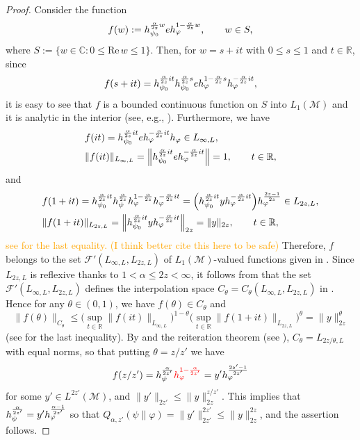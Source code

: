 \documentclass[12pt]{article}
\theoremstyle{definition}
\theoremstyle{remark}
\numberwithin{equation}{section}
\def\Me{\mathcal M}
\def\cF{\mathcal{F}}
\def\ffi{\varphi}
\def\bR{\mathbb{R}}
\def\bC{\mathbb{C}}
\def\Re{\mathrm{Re}\,}
\begin{document}
\begin{proof}
Consider the function
\begin{align}\label{F-4.18}
f(w):=h_{\psi_0}^{{\alpha\over2z}w}eh_\ffi^{1-{\alpha\over2z}w},\qquad w\in S,
\end{align}
where $S:=\{w\in\bC:0\le\Re w\le1\}$. Then, for $w=s+it$ with $0\le s\le1$ and $t\in\bR$, since
\[
f(s+it)=h_{\psi_0}^{{\alpha\over2z}it}h_{\psi_0}^{{\alpha\over2z}s}e
h_\ffi^{1-{\alpha\over2z}s}h_\ffi^{-{\alpha\over2z}it},
\]
it is easy to see that $f$ is a bounded continuous function on $S$ into $L_1(\Me)$ and it is analytic in the
interior (see, e.g., \cite[Lemma 9.19, Theorem 9.18(c)]{hiai2021lectures}). Furthermore, we have
\begin{align*}
&f(it)=h_{\psi_0}^{{\alpha\over2z}it}eh_\ffi^{-{\alpha\over2z}it}h_\ffi\in L_{\infty,L}, \\
&\|f(it)\|_{L_{\infty,L}}=\Big\|h_{\psi_0}^{{\alpha\over2z}it}eh_\ffi^{-{\alpha\over2z}it}\Big\|=1,
\qquad t\in\bR,
\end{align*}
and
\begin{align*}
&f(1+it)=h_{\psi_0}^{{\alpha\over2z}it}h_\psi^{\alpha\over2z}
h_\ffi^{1-{\alpha\over2z}}h_\ffi^{-{\alpha\over2z}it}
=\Bigl(h_{\psi_0}^{{\alpha\over2z}it}yh_\ffi^{-{\alpha\over2z}it}\Bigr)h_\ffi^{2z-1\over2z}\in L_{2z,L}, \\
&\|f(1+it)\|_{L_{2z,L}}=\Big\|h_{\psi_0}^{{\alpha\over2z}it}yh_\ffi^{-{\alpha\over2z}it}\Big\|_{2z}=\|y\|_{2z},
\qquad t\in\bR,
\end{align*}
\textcolor{orange}{ see \cite[Lemmas 10.1 and 10.2]{kosaki1984applications} for the last
equality. (I think
better cite this here to be safe)}
Therefore, $f$ belongs to the set $\cF'(L_{\infty,L},L_{2z,L})$ of $L_1(\Me)$-valued functions given in
\cite[Definition 1.4]{kosaki1984applications}. Since $L_{2z,L}$ is reflexive thanks to $1<\alpha\le2z<\infty$,
it follows from \cite[Theorems 1.5, Remark 3.4]{kosaki1984applications} that the set
$\cF'(L_{\infty,L},L_{2z,L})$ defines the interpolation space $C_\theta=C_\theta(L_{\infty,L},L_{2z,L})$ in
\cite[Definition 1.1]{kosaki1984applications}. Hence for any $\theta\in(0,1)$, we have $f(\theta)\in C_\theta$
and
\[
\|f(\theta)\|_{C_\theta}\le\biggl(\sup_{t\in\bR}\|f(it)\|_{L_{\infty,L}}\biggr)^{1-\theta}
\biggl(\sup_{t\in\bR}\|f(1+it)\|_{L_{2z,L}}\biggr)^\theta=\|y\|_{2z}^\theta
\]
{\color{red}(see \cite[Lemma 4.3.2(ii)]{bergh1976interpolation} for the last inequality).} By
\cite[Theorem 1.9]{kosaki1984applications} and the reiteration theorem {\color{red}(see
\cite{cwikel1978complex}),} $C_\theta=L_{2z/\theta,L}$ with {\color{red}equal norms}, so that putting
$\theta=z/z'$ we have
\[
f(z/z')=h_\psi^{\alpha\over2z'}{\color{red}h_\ffi^{1-{\alpha\over2z'}}}=y'h_\ffi^{2z'-1\over2z'}
\]
for some $y'\in L^{2z'}(\Me)$, and $\|y'\|_{2z'}\le\|y\|_{2z}^{z/z'}$. This implies that
$h_\psi^{\alpha\over2z'}=y'h_\ffi^{\alpha-1\over2z'}$ so that
$Q_{\alpha,z'}(\psi\|\ffi)=\|y'\|_{2z'}^{2z'}\le\|y\|_{2z}^{2z}$, and the assertion follows.
\end{proof}
\end{document}
